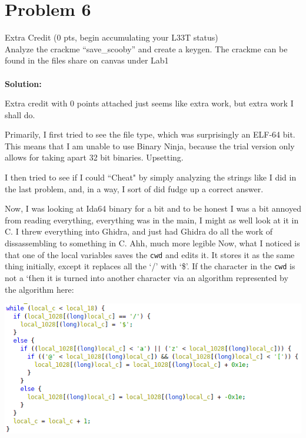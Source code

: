 \documentclass[12pt]{article}
\begin{document}
\section{Problem 6}
Extra Credit (0 pts, begin accumulating your L33T status) \\

Analyze the crackme “save\_scooby” and create a keygen. The crackme can be found in the
files share on canvas under Lab1
\\ \\
\textbf{Solution:\\} 

Extra credit with 0 points attached just seems like extra work, but extra work I shall do. 

Primarily, I first tried to see the file type, which was surprisingly an ELF-64 bit. This means that I am unable to use Binary Ninja,
because the trial version only allows for taking apart 32 bit binaries. Upsetting. 

I then tried to see if I could ``Cheat" by simply analyzing the strings like I did in the last problem, and, in a way, I sort of did fudge up
a correct answer.

Now, I was looking at Ida64 binary for a bit and to be honest I was a bit annoyed from reading everything, everything was in the main, I 
might as well look at it in C. I threw everything into Ghidra, and just had Ghidra do all the work of dissassembling to something in C. Ahh,
much more legible Now, what I noticed is that one of the local variables saves the \texttt{cwd} and edits it. It stores it as
the same thing initially, except it replaces all the `/' with `\$'. If the character in the \texttt{cwd} is not a `\' then it is turned into 
another character via an algorithm represented by the algorithm here:

\begin{center}
	\includegraphics[scale=.92]{algorithm6.png}
\end{center}
\end{document}
